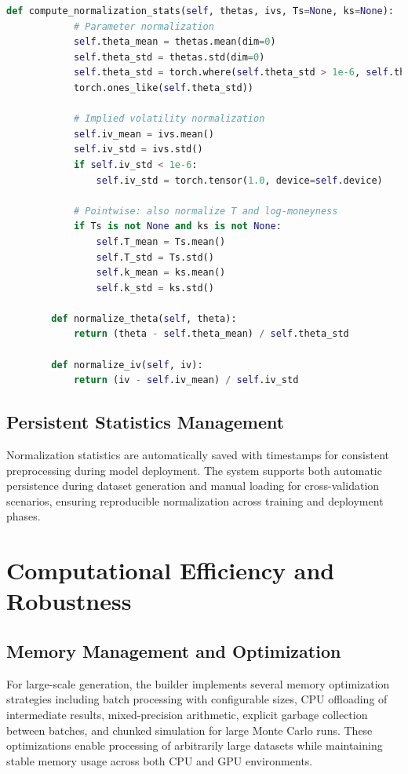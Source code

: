 	\begin{lstlisting}[language=Python, basicstyle=\ttfamily\footnotesize, 
		frame=single, rulecolor=\color{black!20}, backgroundcolor=\color{gray!5},
		showstringspaces=false, breaklines=true, columns=fullflexible]
		def compute_normalization_stats(self, thetas, ivs, Ts=None, ks=None):
			# Parameter normalization
			self.theta_mean = thetas.mean(dim=0)
			self.theta_std = thetas.std(dim=0)
			self.theta_std = torch.where(self.theta_std > 1e-6, self.theta_std, 
			torch.ones_like(self.theta_std))
			
			# Implied volatility normalization
			self.iv_mean = ivs.mean()
			self.iv_std = ivs.std()
			if self.iv_std < 1e-6:
				self.iv_std = torch.tensor(1.0, device=self.device)
			
			# Pointwise: also normalize T and log-moneyness
			if Ts is not None and ks is not None:
				self.T_mean = Ts.mean()
				self.T_std = Ts.std()
				self.k_mean = ks.mean()
				self.k_std = ks.std()
			
		def normalize_theta(self, theta):
			return (theta - self.theta_mean) / self.theta_std
			
		def normalize_iv(self, iv):
			return (iv - self.iv_mean) / self.iv_std
	\end{lstlisting}
	
	\subsection{Persistent Statistics Management}
	
	Normalization statistics are automatically saved with timestamps for consistent preprocessing during model deployment. The system supports both automatic persistence during dataset generation and manual loading for cross-validation scenarios, ensuring reproducible normalization across training and deployment phases.
	
	\section{Computational Efficiency and Robustness}
	
	\subsection{Memory Management and Optimization}
	
	For large-scale generation, the builder implements several memory optimization strategies including batch processing with configurable sizes, CPU offloading of intermediate results, mixed-precision arithmetic, explicit garbage collection between batches, and chunked simulation for large Monte Carlo runs. These optimizations enable processing of arbitrarily large datasets while maintaining stable memory usage across both CPU and GPU environments.
	
